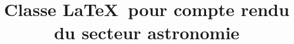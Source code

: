 \documentclass{plasci-secastro}
\title{Classe \LaTeX\ pour compte rendu du secteur astronomie}
\begin{document}
\maketitle
\lipsum
\lipsum
\end{document}
